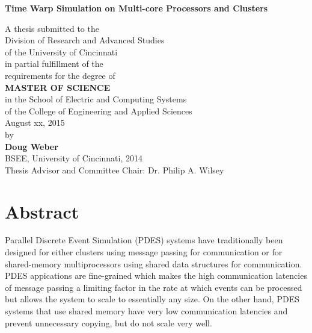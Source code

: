 \documentclass[11pt]{book}
\begin{document}
\thispagestyle{empty}

\doublespacing

\vspace*{0.5in}

\begin{center}
\LARGE{\textbf{Time Warp Simulation on Multi-core Processors and Clusters}}

\vspace*{0.4in}

  {\large A thesis submitted to the\\[0.20in]
    Division of Research and Advanced Studies\\
    of the University of Cincinnati\\[0.20in]
    in partial fulfillment of the\\
    requirements for the degree of\\[0.20in]
    \textbf{MASTER OF SCIENCE}\\[0.20in]
    in the School of Electric and Computing Systems\\
    of the College of Engineering and Applied Sciences\\[0.20in]
    August xx, 2015\\[0.20in]
    by\\[0.20in]
    \textbf{Doug Weber}\\
    BSEE, University of Cincinnati, 2014\\}
  \vspace{0.5in}
  {\large Thesis Advisor and Committee Chair:  Dr. Philip A. Wilsey}
\end{center}

\clearpage

\setcounter{page}{1}
\clearpage

\chapter*{Abstract}


Parallel Discrete Event Simulation (PDES) systems have traditionally been designed for either
clusters using message passing for communication or for shared-memory multiprocessors using shared
data structures for communication. PDES appications are fine-grained which makes the high
communication latencies of message passing a limiting factor in the rate at which events can
be processed but allows the system to scale to essentially any size. On the other hand, PDES
systems that use shared memory have very low communication latencies and prevent unnecessary
copying, but do not scale very well.
\end{document}
